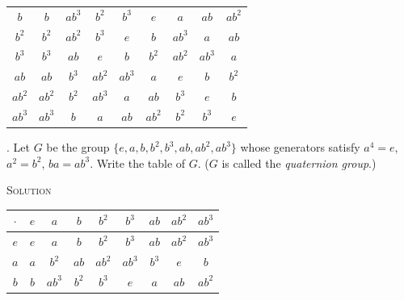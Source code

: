 \documentclass[twoside]{amsart}
\newcommand{\solution}{\textsc{Solution}\xspace}
\begin{document}
\begin{enumerate}[A.]
\begin{center}
\begin{tabular}{c|cccccccc}
    $b$ & $b$ & $ab^3$ & $b^2$ & $b^3$ & $e$ & $a$ & $ab$ & $ab^2$ \\

    $b^2$ & $b^2$ & $ab^2$ & $b^3$ & $e$ & $b$ & $ab^3$ & $a$ & $ab$ \\

    $b^3$ & $b^3$ & $ab$ & $e$ & $b$ & $b^2$ & $ab^2$ & $ab^3$ & $a$ \\

    $ab$ & $ab$ & $b^3$ & $ab^2$ & $ab^3$ & $a$ & $e$ & $b$ & $b^2$ \\

    $ab^2$ & $ab^2$ & $b^2$ & $ab^3$ & $a$ & $ab$ & $b^3$ & $e$ & $b$ \\

    $ab^3$ & $ab^3$ & $b$ & $a$ & $ab$ & $ab^2$ & $b^2$ & $b^3$ & $e$
    \end{tabular}
    \end{center}

    . Let $G$ be the group $\{e,a,b,b^2,b^3,ab,ab^2,ab^3\}$ whose
    generators satisfy $a^4=e$, $a^2=b^2$, $ba=ab^3$. Write the table of
    $G$. ($G$ is called the \emph{quaternion group}.)

    \noindent \solution
    \begin{center}
    \begin{tabular}{c|cccccccc}
    $\cdot$ & $e$ & $a$ & $b$ & $b^2$ & $b^3$ & $ab$ & $ab^2$ & $ab^3$\\\hline

    $e$ & $e$ & $a$ & $b$ & $b^2$ & $b^3$ & $ab$ & $ab^2$ & $ab^3$ \\

    $a$ & $a$ & $b^2$ & $ab$ & $ab^2$ & $ab^3$ & $b^3$ & $e$ & $b$ \\

    $b$ & $b$ & $ab^3$ & $b^2$ & $b^3$ & $e$ & $a$ & $ab$ & $ab^2$ \\


\end{tabular}
\end{center}
\end{enumerate}
\end{document}
